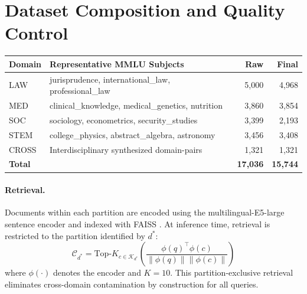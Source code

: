 \documentclass[a4paper,fleql]{cas-sc}
\begin{document}
\section{Dataset Composition and Quality Control}
\label{app:dataset}
\vspace{6pt plus 4pt minus 3pt}
\begin{center}
\begingroup
{}
\label{tab:data}
\begin{tabular}{llrr}
\toprule
\textbf{Domain} & \textbf{Representative MMLU Subjects} & \textbf{Raw} & \textbf{Final} \\
\midrule
LAW   & jurisprudence, international\_law, professional\_law  & 5{,}000 & 4{,}968 \\
MED   & clinical\_knowledge, medical\_genetics, nutrition      & 3{,}860 & 3{,}854 \\
SOC   & sociology, econometrics, security\_studies             & 3{,}399 & 2{,}193 \\
STEM  & college\_physics, abstract\_algebra, astronomy         & 3{,}456 & 3{,}408 \\
CROSS & Interdisciplinary synthesized domain-pairs             & 1{,}321 & 1{,}321 \\
\midrule
\textbf{Total} & & \textbf{17{,}036} & \textbf{15{,}744} \\
\bottomrule
\end{tabular}
\endgroup
\end{center}
\vspace{6pt plus 4pt minus 3pt}

\paragraph{Retrieval.}
Documents within each partition are encoded using the multilingual-E5-large
sentence encoder \citep{wang2024multilingual} and indexed with FAISS
\citep{johnson2019faiss}. At inference time, retrieval is restricted to the
partition identified by $d^*$:
\begin{equation}
    \mathcal{C}_{d^*} = \text{Top-}K_{c \in \mathcal{K}_{d^*}} \left(
    \frac{\phi(q)^\top \phi(c)}{\|\phi(q)\| \|\phi(c)\|} \right)
    \label{eq:retrieval}
\end{equation}
where $\phi(\cdot)$ denotes the encoder and $K = 10$. This
partition-exclusive retrieval eliminates cross-domain contamination by
construction for all queries.
\end{document}

